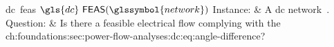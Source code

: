 \begin{problem}[framed]{\acrlong{dc}~\acrlong{feas} $\gls{dc}~\feas
(\glssymbol{network})$}%
  Instance: & A \gls{dc} network~\dcnetworktuple.\\
  Question: & Is there a feasible electrical flow complying with
  the~
  {ch:foundations:sec:power-flow-analyses:dc:eq:angle-difference}?
\end{problem}%
